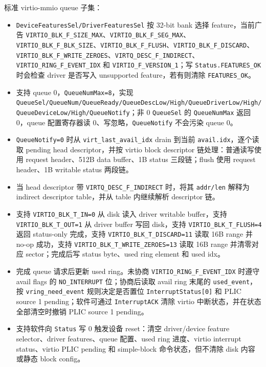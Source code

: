 \documentclass[UTF8,a4paper,11pt]{ctexart}
\begin{document}
标准 virtio-mmio queue 子集：

\begin{itemize}
  \item \texttt{DeviceFeaturesSel/DriverFeaturesSel} 按 32-bit bank 选择 feature，当前广告 \texttt{VIRTIO\_BLK\_F\_SIZE\_MAX}、\texttt{VIRTIO\_BLK\_F\_SEG\_MAX}、\texttt{VIRTIO\_BLK\_F\_BLK\_SIZE}、\texttt{VIRTIO\_BLK\_F\_FLUSH}、\texttt{VIRTIO\_BLK\_F\_DISCARD}、\texttt{VIRTIO\_BLK\_F\_WRITE\_ZEROES}、\texttt{VIRTQ\_DESC\_F\_INDIRECT}、\texttt{VIRTIO\_RING\_F\_EVENT\_IDX} 和 \texttt{VIRTIO\_F\_VERSION\_1}；写 \texttt{Status.FEATURES\_OK} 时会检查 driver 是否写入 unsupported feature，若有则清除 \texttt{FEATURES\_OK}。
  \item 支持 queue 0，\texttt{QueueNumMax=8}，实现 \texttt{QueueSel/QueueNum/QueueReady/QueueDescLow/High/QueueDriverLow/High/QueueDeviceLow/High/QueueNotify}；非 0 \texttt{QueueSel} 的 \texttt{QueueNumMax} 返回 0，queue 配置寄存器读 0、写忽略，\texttt{QueueNotify} 不会污染 queue 0。
  \item \texttt{QueueNotify=0} 时从 \texttt{virt\_last\_avail\_idx} drain 到当前 \texttt{avail.idx}，逐个读取 pending head descriptor，并按 virtio block descriptor 链处理：普通读写使用 request header、512B data buffer、1B status 三段链；flush 使用 request header、1B writable status 两段链。
  \item 当 head descriptor 带 \texttt{VIRTQ\_DESC\_F\_INDIRECT} 时，将其 \texttt{addr/len} 解释为 indirect descriptor table，并从 table 内继续解析 descriptor 链。
  \item 支持 \texttt{VIRTIO\_BLK\_T\_IN=0} 从 disk 读入 driver writable buffer，支持 \texttt{VIRTIO\_BLK\_T\_OUT=1} 从 driver buffer 写回 disk，支持 \texttt{VIRTIO\_BLK\_T\_FLUSH=4} 返回 status-only 完成，支持 \texttt{VIRTIO\_BLK\_T\_DISCARD=11} 读取 16B range 并 no-op 成功，支持 \texttt{VIRTIO\_BLK\_T\_WRITE\_ZEROES=13} 读取 16B range 并清零对应 sector；完成后写 status byte、used ring element 和 used idx。
  \item 完成 queue 请求后更新 used ring。未协商 \texttt{VIRTIO\_RING\_F\_EVENT\_IDX} 时遵守 avail flags 的 \texttt{NO\_INTERRUPT} 位；协商后读取 avail ring 末尾的 \texttt{used\_event}，按 \texttt{vring\_need\_event} 规则决定是否置位 \texttt{InterruptStatus[0]} 和 PLIC source 1 pending；软件可通过 \texttt{InterruptACK} 清除 virtio 中断状态，并在状态全部清空时撤销 PLIC source 1 pending。
  \item 支持软件向 \texttt{Status} 写 0 触发设备 reset：清空 driver/device feature selector、driver features、queue 配置、used ring 进度、virtio interrupt status、virtio PLIC pending 和 simple-block 命令状态，但不清除 disk 内容或静态 block config。
\end{itemize}
\end{document}
